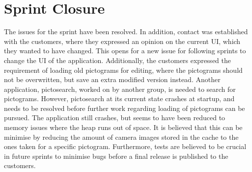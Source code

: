 \section{Sprint Closure}
The issues for the sprint have been resolved.
In addition, contact was established with the customers, where they expressed an opinion on the current UI, which they wanted to have changed.
This opens for a new issue for following sprints to change the UI of the application.
Additionally, the customers expressed the requirement of loading old pictograms for editing, where the pictograms should not be overwritten, but save an extra modified version instead.
Another application, pictosearch, worked on by another group, is needed to search for pictograms.
However, pictosearch at its current state crashes at startup, and needs to be resolved before further work regarding loading of pictograms can be pursued.
The application still crashes, but seems to have been reduced to memory issues where the heap runs out of space.
It is believed that this can be minimise by reducing the amount of camera images stored in the cache to the ones taken for a specific pictogram.
Furthermore, tests are believed to be crucial in future sprints to minimise bugs before a final release is published to the customers.